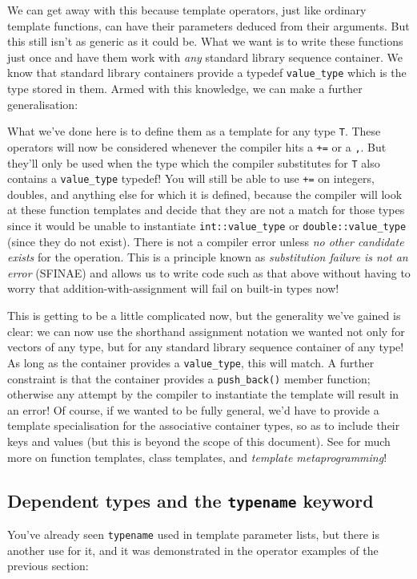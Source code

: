 \documentclass[a4paper]{scrartcl}
\begin{document}
We can get away with this because template operators, just like ordinary template functions, can have their parameters deduced from their arguments. But this still isn't as generic as it could be. What we want is to write these functions just once and have them work with \emph{any} standard library sequence container. We know that standard library containers provide a typedef \verb|value_type| which is the type stored in them. Armed with this knowledge, we can make a further generalisation:



What we've done here is to define them as a template for any type \verb|T|. These operators will now be considered whenever the compiler hits a \verb|+=| or a \verb|,|. But they'll only be used when the type which the compiler substitutes for \verb|T| also contains a \verb|value_type| typedef! You will still be able to use \verb|+=| on integers, doubles, and anything else for which it is defined, because the compiler will look at these function templates and decide that they are not a match for those types since it would be unable to instantiate \verb|int::value_type| or \verb|double::value_type| (since they do not exist). There is not a compiler error unless \emph{no other candidate exists} for the operation. This is a principle known as \emph{substitution failure is not an error} (SFINAE) and allows us to write code such as that above without having to worry that addition-with-assignment will fail on built-in types now!

This is getting to be a little complicated now, but the generality we've gained is clear: we can now use the shorthand assignment notation we wanted not only for vectors of any type, but for any standard library sequence container of any type! As long as the container provides a \verb|value_type|, this will match. A further constraint is that the container provides a \verb|push_back()| member function; otherwise any attempt by the compiler to instantiate the template will result in an error! Of course, if we wanted to be fully general, we'd have to provide a template specialisation for the associative container types, so as to include their keys and values (but this is beyond the scope of this document). See\cite{Templates} for much more on function templates, class templates, and \emph{template metaprogramming}!

\subsection{Dependent types and the \texttt{typename} keyword}
You've already seen \verb|typename| used in template parameter lists, but there is another use for it, and it was demonstrated in the operator examples of the previous section:
\end{document}
